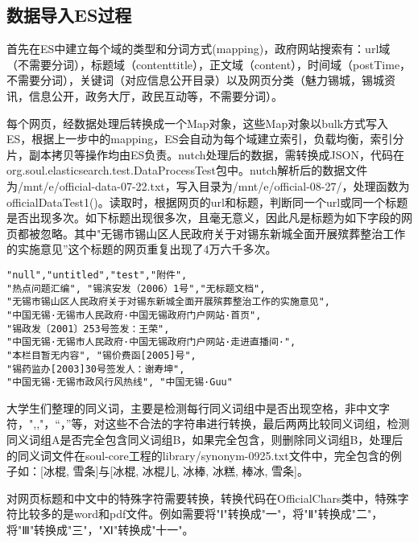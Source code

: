 \subsection{数据导入ES过程}
\par 首先在ES中建立每个域的类型和分词方式(mapping)，政府网站搜索有：url域（不需要分词），标题域（contenttitle），正文域（content），时间域（postTime，不需要分词），关键词（对应信息公开目录）以及网页分类（魅力锡城，锡城资讯，信息公开，政务大厅，政民互动等，不需要分词）。
\par 每个网页，经数据处理后转换成一个Map对象，这些Map对象以bulk方式写入ES，根据上一步中的mapping，ES会自动为每个域建立索引，负载均衡，索引分片，副本拷贝等操作均由ES负责。nutch处理后的数据，需转换成JSON，代码在org.soul.elasticsearch.test.DataProcessTest包中。nutch解析后的数据文件为/mnt/e/official-data-07-22.txt，写入目录为/mnt/e/official-08-27/，处理函数为officialDataTest1()。读取时，根据网页的url和标题，判断同一个url或同一个标题是否出现多次。如下标题出现很多次，且毫无意义，因此凡是标题为如下字段的网页都被忽略。其中"无锡市锡山区人民政府关于对锡东新城全面开展殡葬整治工作的实施意见”这个标题的网页重复出现了4万六千多次。
\begin{verbatim}
"null","untitled","test","附件",
"热点问题汇编", "锡滨安发（2006）1号","无标题文档",
"无锡市锡山区人民政府关于对锡东新城全面开展殡葬整治工作的实施意见",
"中国无锡·无锡市人民政府·中国无锡政府门户网站·首页", 
"锡政发〔2001〕253号签发：王荣",
"中国无锡·无锡市人民政府·中国无锡政府门户网站·走进直播间·", 
"本栏目暂无内容", "锡价费函[2005]号", 
"锡药监办[2003]30号签发人：谢寿坤",
"中国无锡·无锡市政风行风热线", "中国无锡·Guu" 
\end{verbatim}
\par 大学生们整理的同义词，主要是检测每行同义词组中是否出现空格，非中文字符，",,"，“，”等，对这些不合法的字符串进行转换，最后两两比较同义词组，检测同义词组A是否完全包含同义词组B，如果完全包含，则删除同义词组B，处理后的同义词文件在soul-core工程的library/synonym-0925.txt文件中，完全包含的例子如：[冰棍, 雪条]与[冰棍, 冰棍儿, 冰棒, 冰糕, 棒冰, 雪条]。
\par 对网页标题和中文中的特殊字符需要转换，转换代码在OfficialChars类中，特殊字符比较多的是word和pdf文件。例如需要将"Ⅰ"转换成"一"，将"Ⅱ"转换成"二"，将"Ⅲ"转换成"三"，"Ⅺ"转换成"十一"。